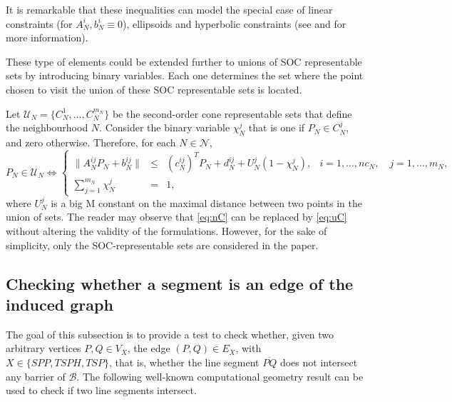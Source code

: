 \documentclass[a4paper,  review, authoryear, 1p., doubleblind]{elsarticle}
\begin{document}
	It is remarkable that these inequalities can model the special case of linear constraints (for $A_N^{i}, b_N^i\equiv 0$), ellipsoids and hyperbolic constraints (see \citet{lobo_applications_1998} and \citet{boyd_convex_2004} for more information).
	
	These type of elements could be extended further to unions of SOC representable sets by introducing binary variables. Each one determines the set where the point chosen to visit the union of these SOC representable sets is located.
	
	Let $\mathcal U_N=\{C^1_N, \ldots, C^{m_N}_N\}$ be the second-order cone representable sets that define the neighbourhood $N$. Consider the binary variable $\chi_{N}^{j}$ that is one if $P_N\in C^j_N$, and zero otherwise.
	Therefore, for each $N\in \mathcal N$,
	\begin{equation}\label{eq:uC}\tag{U-C}
		P_N\in \mathcal U_N \Longleftrightarrow
		\left\{
		\begin{array}{cclr}
			\|A_N^{ij} P_N + b_N^{ij}\|& \leq & (c_N^{ij})^T P_N + d_N^{ij}+ U_N^{j}(1-\chi_N^{j}), & i=1,\ldots,nc_N,\quad j=1,\ldots,m_N, \\
			\sum_{j = 1}^{m_N} \chi_N^{j} & =    & 1,
		\end{array}
		\right.
	\end{equation}
	where $U_N^j$ is a big M constant on the maximal distance between two points in the union of sets.
	The reader may observe that \eqref{eq:nC} can be replaced by \eqref{eq:uC} without altering the validity of the formulations. However, for the sake of simplicity, only the SOC-representable sets are considered in the paper.
	
	
	\subsection{Checking whether a segment is an edge of the induced graph}
	
	The goal of this subsection is to provide a test to check whether, given two arbitrary vertices $P, Q\in V_X$, the edge $(P, Q)\in E_X$, with $X\in\{SPP, TSPH, TSP\}$, that is, whether the line segment $\overline{PQ}$ does not intersect any barrier of $\mathcal B$. The following well-known computational geometry result can be used to check if two line segments intersect.
	
\end{document}
